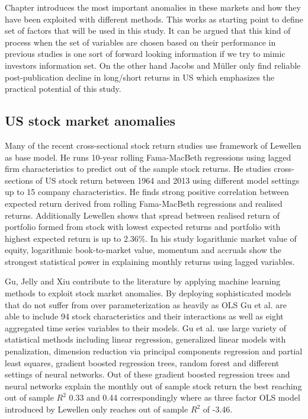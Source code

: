 \documentclass{article}
\begin{document}
Chapter introduces the most important anomalies in these markets and how they have been exploited with different methods. This works as starting point to define set of factors that will be used in this study. It can be argued that this kind of process when the set of variables are chosen based on their performance in previous studies is one sort of forward looking information if we try to mimic investors information set. On the other hand Jacobs and Müller \citeyear{JACOBS2020213} only find reliable post-publication decline in long/short returns in US which emphasizes the practical potential of this study.

\subsection{US stock market anomalies}

Many of the recent cross-sectional stock return studies use framework of Lewellen \citeyear{lewellen2015} as base model. He runs 10-year rolling Fama-MacBeth regressions using lagged firm characteristics to predict out of the sample stock returns. He studies cross-sections of US stock return between 1964 and 2013 using different model settings up to 15 company characteristics. He finds strong positive correlation between expected return derived from rolling Fama-MacBeth regressions and realised returns. Additionally Lewellen shows that spread between realised return of portfolio formed from stock with lowest expected returns and portfolio with highest expected return is up to 2.36\%. In his study logarithmic market value of equity, logarithmic book-to-market value, momentum and accruals show the strongest statistical power in explaining monthly returns using lagged variables.

Gu, Jelly and Xiu \citeyear{guetal} contribute to the literature by applying machine learning methods to exploit stock market anomalies. By deploying sophisticated models that do not suffer from over parameterization as heavily as OLS Gu et al. are able to include 94 stock characteristics and their interactions as well as eight aggregated time series variables to their models. Gu et al. use large variety of statistical methods including linear regression, generalized linear models with penalization, dimension reduction via principal components regression and partial least squares, gradient boosted regression trees, random forest and different settings of neural networks. Out of these gradient boosted regression trees and neural networks \footnotemark explain the monthly out of sample stock return the best reaching out of sample $R^{2}$ 0.33 and 0.44 correspondingly where as three factor OLS model introduced by Lewellen \citeyear{lewellen2015} only reaches out of sample $R^{2}$ of -3.46. 
\end{document}
